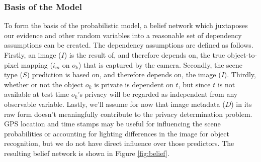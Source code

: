 \documentclass[11pt]{article}
\begin{document}
\subsubsection{Basis of the Model}

To form the basis of the probabilistic model, a belief network which juxtaposes our evidence and other random variables into a reasonable set of dependency assumptions can be created. The dependency assumptions are defined as follows.  Firstly, an image ($I$) is the result of, and therefore depends on, the true object-to-pixel mapping ($i_m$ on $o_k$) that is captured by the camera.  Secondly, the scene type ($S$) prediction is based on, and therefore depends on, the image ($I$).  Thirdly, whether or not the object $o_k$ is private is dependent on $t$, but since $t$ is not available at test time $o_k$'s privacy will be regarded as independent from any observable variable.  Lastly, we'll assume for now that image metadata ($D$) in its raw form doesn't meaningfully contribute to the privacy determination problem.  GPS location and time stamps may be useful for influencing the scene probabilities or accounting for lighting differences in the image for object recognition, but we do not have direct influence over those predictors.  The resulting belief network is shown in Figure \ref{fig:belief}.

\end{document}
